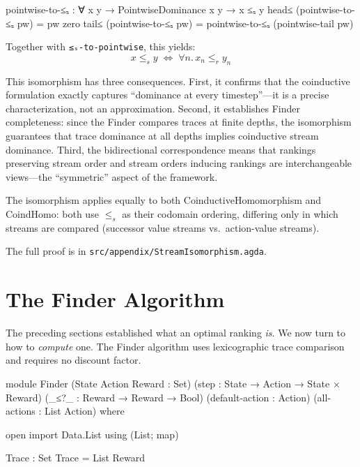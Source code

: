 \documentclass[9pt,a4paper]{article}
\newcommand{\fpath}[1]{\nolinkurl{#1}}
\theoremstyle{plain}
\theoremstyle{definition}
\theoremstyle{remark}
\begin{document}
\begin{code}
  pointwise-to-≤ₛ : ∀ {x y} → PointwiseDominance x y → x ≤ₛ y
  head≤ (pointwise-to-≤ₛ pw) = pw zero
  tail≤ (pointwise-to-≤ₛ pw) = pointwise-to-≤ₛ (pointwise-tail pw)
\end{code}

\noindent Together with \texttt{≤ₛ-to-pointwise}, this yields:
\[
x \le_s y \;\Longleftrightarrow\; \forall n.\, x_n \le_r y_n
\]

This isomorphism has three consequences.  First, it confirms that the coinductive formulation exactly captures ``dominance at every timestep''---it is a precise characterization, not an approximation.  Second, it establishes Finder completeness: since the Finder compares traces at finite depths, the isomorphism guarantees that trace dominance at all depths implies coinductive stream dominance.  Third, the bidirectional correspondence means that rankings preserving stream order and stream orders inducing rankings are interchangeable views---the ``symmetric'' aspect of the framework.

The isomorphism applies equally to both CoinductiveHomomorphism and CoindHomo: both use $\le_s$ as their codomain ordering, differing only in which streams are compared (successor value streams vs.\ action-value streams).

\noindent The full proof is in \fpath{src/appendix/StreamIsomorphism.agda}.


\section{The Finder Algorithm}\label{sec:finder}

The preceding sections established what an optimal ranking \emph{is}.  We now turn to how to \emph{compute} one.  The Finder algorithm uses lexicographic trace comparison and requires no discount factor.

\begin{code}
module Finder
  (State Action Reward : Set)
  (step                : State → Action → State × Reward)
  (_≤?_                : Reward → Reward → Bool)
  (default-action      : Action)
  (all-actions         : List Action)
  where

  open import Data.List using (List; map)

  Trace : Set
  Trace = List Reward
\end{code}
\end{document}
